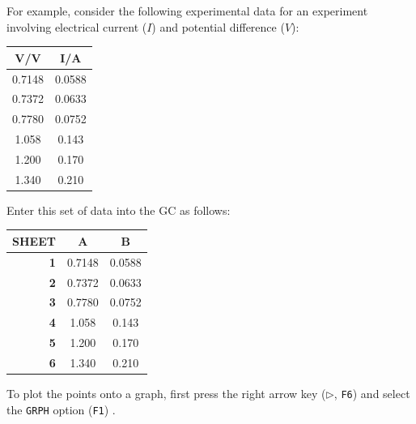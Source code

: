 \documentclass[a5paper]{memoir}
\def\code#1{\texttt{#1}}
\def\Fone{(\code{F1}) }
\begin{document}
For example, consider the following experimental data for an experiment involving electrical current ($I$) and potential difference ($V$): 

\begin{center}
	\setlength{\tabcolsep}{10pt}
	\renewcommand{\arraystretch}{1.2}
	\begin{tabular}{|c|c|}
		\hline
		\textbf{V/V}	& \textbf{I/A} \\
		\hline
		0.7148			& 0.0588 \\
		\hline
		0.7372			& 0.0633 \\
		\hline
		0.7780			& 0.0752 \\
		\hline
		1.058			& 0.143 \\
		\hline
		1.200			& 0.170 \\
		\hline
		1.340			& 0.210 \\
		\hline
	\end{tabular}
\end{center}

Enter this set of data into the GC as follows:

\begin{center}
	\setlength{\tabcolsep}{10pt}
	\renewcommand{\arraystretch}{1.2}
	\begin{tabular}{|r|c|c|}
		\hline
		{\tiny SHEET}& \textbf{A}	& \textbf{B} \\
		\hline
		\textbf{1}	& 0.7148		& 0.0588 \\
		\hline
		\textbf{2}	& 0.7372		& 0.0633 \\
		\hline
		\textbf{3}	& 0.7780		& 0.0752 \\
		\hline
		\textbf{4}	& 1.058			& 0.143 \\
		\hline
		\textbf{5}	& 1.200			& 0.170 \\
		\hline
		\textbf{6}	& 1.340			& 0.210 \\
		\hline
	\end{tabular}
\end{center}

To plot the points onto a graph, first press the right arrow key ($\triangleright$, \code{F6}) and select the \code{GRPH} option \Fone.
\end{document}
